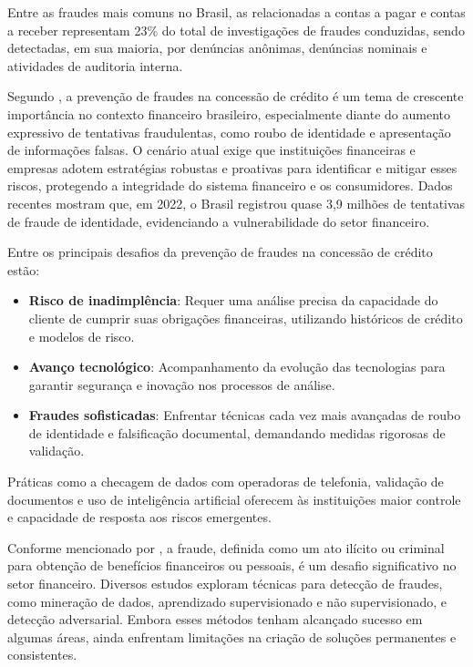 \documentclass[12pt,a4paper]{article}
\begin{document}
Entre as fraudes mais comuns no Brasil, as relacionadas a contas a pagar e contas a receber representam 23\% do total de investigações de fraudes conduzidas, sendo detectadas, em sua maioria, por denúncias anônimas, denúncias nominais e atividades de auditoria interna.

Segundo \cite{thinkdata2024}, a prevenção de fraudes na concessão de crédito é um tema de crescente importância no contexto financeiro brasileiro, especialmente diante do aumento expressivo de tentativas fraudulentas, como roubo de identidade e apresentação de informações falsas. O cenário atual exige que instituições financeiras e empresas adotem estratégias robustas e proativas para identificar e mitigar esses riscos, protegendo a integridade do sistema financeiro e os consumidores. Dados recentes mostram que, em 2022, o Brasil registrou quase 3,9 milhões de tentativas de fraude de identidade, evidenciando a vulnerabilidade do setor financeiro.

Entre os principais desafios da prevenção de fraudes na concessão de crédito estão:
\begin{itemize}
    \item \textbf{Risco de inadimplência}: Requer uma análise precisa da capacidade do cliente de cumprir suas obrigações financeiras, utilizando históricos de crédito e modelos de risco.
    \item \textbf{Avanço tecnológico}: Acompanhamento da evolução das tecnologias para garantir segurança e inovação nos processos de análise.
    \item \textbf{Fraudes sofisticadas}: Enfrentar técnicas cada vez mais avançadas de roubo de identidade e falsificação documental, demandando medidas rigorosas de validação.
\end{itemize}

Práticas como a checagem de dados com operadoras de telefonia, validação de documentos e uso de inteligência artificial oferecem às instituições maior controle e capacidade de resposta aos riscos emergentes.

Conforme mencionado por \cite{maniraj2019}, a fraude, definida como um ato ilícito ou criminal para obtenção de benefícios financeiros ou pessoais, é um desafio significativo no setor financeiro. Diversos estudos exploram técnicas para detecção de fraudes, como mineração de dados, aprendizado supervisionado e não supervisionado, e detecção adversarial. Embora esses métodos tenham alcançado sucesso em algumas áreas, ainda enfrentam limitações na criação de soluções permanentes e consistentes.
\end{document}
